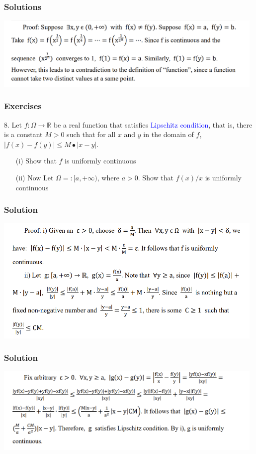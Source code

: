 \documentclass{beamer}
\begin{document}
    \begin{frame}
        \frametitle{Solutions}
        \includegraphics[width=0.98\textwidth]{ex8.png}
        
    \end{frame}
    \begin{frame}
        \frametitle{Exercises}
        8. Let $f:\Omega \to \mathbb{R}$ be a real function that satisfies \textcolor{blue}{Lipschitz condition}, that is, 
        there is a constant $M>0$ such that for all $x$ and $y$ in the domain of $f$, $|f(x)-f(y)|\leq M∙|x-y|$.\\
        \vspace{1em}
        \begin{itemize}
            \item [(i)]Show that $f$ is uniformly continuous
            \item [(ii)] Now Let $\Omega=:[a, +\infty)$, where $a>0$. Show that $f(x)/x$ is uniformly continuous
        \end{itemize} 
    
    \end{frame}
    \begin{frame}
        \frametitle{Solution}
        \includegraphics[width=0.98\textwidth]{ex4_1.png}
    \end{frame}
    \begin{frame}
        \frametitle{Solution}
        \includegraphics[width=0.98\textwidth]{ex4_2.png}
    \end{frame}
\end{document}
